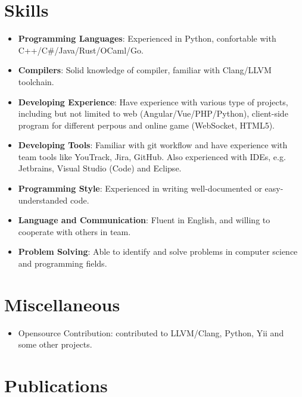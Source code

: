 \documentclass{resume}
\begin{document}
\section{Skills}
\begin{itemize}[parsep=0.25ex]
  \item \textbf{Programming Languages}:
    Experienced in Python, confortable with C++/C\#/Java/Rust/OCaml/Go.

  \item \textbf{Compilers}:
    Solid knowledge of compiler, familiar with Clang/LLVM toolchain.
  
  \item \textbf{Developing Experience}:
    Have experience with various type of projects, including but not limited to web (Angular/Vue/PHP/Python), client-side program for different perpous and online game (WebSocket, HTML5).

  \item \textbf{Developing Tools}:
    Familiar with git workflow and have experience with team tools like YouTrack, Jira, GitHub. Also experienced with IDEs, e.g. Jetbrains, Visual Studio (Code) and Eclipse.
  
  \item \textbf{Programming Style}:
    Experienced in writing well-documented or easy-understanded code.
  
  \item \textbf{Language and Communication}:
    Fluent in English, and willing to cooperate with others in team.
  
  \item \textbf{Problem Solving}:
    Able to identify and solve problems in computer science and programming fields.
\end{itemize}

\section{Miscellaneous}
\begin{itemize}[parsep=0.25ex]
  \item Opensource Contribution: contributed to LLVM/Clang, Python, Yii and some other projects.
\end{itemize}

\section{Publications}


%
%
\end{document}
